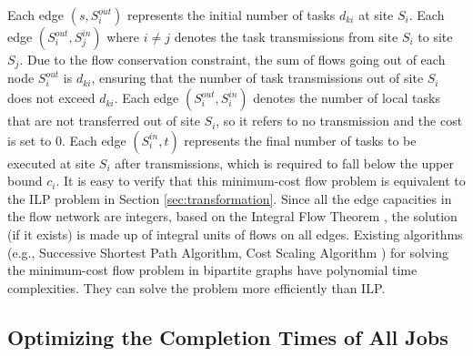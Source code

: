 Each edge $(s, S^{out}_i)$ represents the initial number of tasks $d_{ki}$ at site $S_i$. Each edge $(S_i^{out},S_j^{in})$ where $i \neq j$ denotes the task transmissions from site $S_i$ to site $S_j$. Due to the flow conservation constraint, the sum of flows going out of each node $S_i^{out}$ is $d_{ki}$, ensuring that the number of task transmissions out of site $S_i$ does not exceed $d_{ki}$. Each edge $(S_i^{out},S_i^{in})$ denotes the number of local tasks that are not transferred out of site $S_i$, so it refers to no transmission and the cost is set to 0. Each edge $(S^{in}_i, t)$ represents the final number of tasks to be executed at site $S_i$ after transmissions, which is required to fall below the upper bound $c_i$. It is easy to verify that this minimum-cost flow problem is equivalent to the ILP problem in Section \ref{sec:transformation}. Since all the edge capacities in the flow network are integers, based on the Integral Flow Theorem \cite{lawler2001combinatorial}, the solution (if it exists) is made up of integral units of flows on all edges. Existing algorithms (e.g., Successive Shortest Path Algorithm, Cost Scaling Algorithm \cite{kovacs2015minimum}) for solving the minimum-cost flow problem in bipartite graphs have polynomial time complexities. They can solve the problem more efficiently than ILP.

\subsection{Optimizing the Completion Times of All Jobs}

